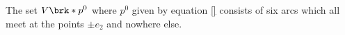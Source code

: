 
\begin{proposition}\label{pr:n3_polynomial_Vp0}
  The set $V\brk*{p^0}$ where $p^0$ given by equation \eqref{}
  consists of six arcs which all meet at the points $\pm e_2$ and nowhere else.
\end{proposition}
